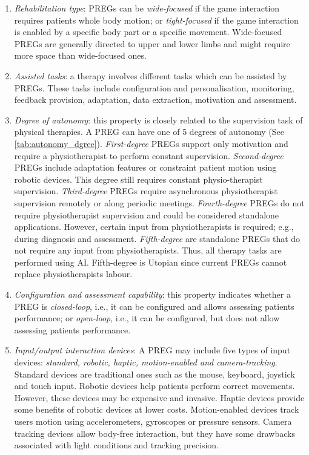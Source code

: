 \begin{enumerate}
    \item \emph{Rehabilitation type}: \acp{PREG} can be \textit{wide-focused} if the game interaction requires patients whole body motion; or \textit{tight-focused} if the game interaction is enabled by a specific body part or a specific movement. Wide-focused \acp{PREG} are generally directed to upper and lower limbs and might require more space than wide-focused ones.
    
    \item \emph{Assisted tasks}: a therapy involves different tasks which can be assisted by \acp{PREG}. These tasks include configuration and personalisation, monitoring, feedback provision, adaptation, data extraction, motivation and assessment.
    
    \item \emph{Degree of autonomy}: this property is closely related to the supervision task of physical therapies. A \ac{PREG} can have one of 5 degrees of autonomy (See \autoref{tab:autonomy_dgree}). \textit{First-degree} \acp{PREG} support only motivation and require a physiotherapist to perform constant supervision. \textit{Second-degree} \acp{PREG} include adaptation features or constraint patient motion using robotic devices. This degree still requires constant physio-therapist supervision. \textit{Third-degree} \acp{PREG} require asynchronous physiotherapist supervision remotely or along periodic meetings. \textit{Fourth-degree} \acp{PREG} do not require physiotherapist supervision and could be considered standalone applications. However, certain input from physiotherapists is required; e.g., during diagnosis and assessment. \textit{Fifth-degree} are standalone \acp{PREG} that do not require any input from physiotherapists. Thus, all therapy tasks are performed using \ac{AI}. Fifth-degree is Utopian since current \acp{PREG} cannot replace physiotherapists labour.
    
    \item \emph{Configuration and assessment capability}: this property indicates whether a \ac{PREG} is \textit{closed-loop}, i.e., it can be configured and allows assessing patients performance; or \textit{open-loop}, i.e., it can be configured, but does not allow assessing patients performance.
    
    \item \emph{Input/output interaction devices}: A \ac{PREG} may include five types of input devices: \textit{standard, robotic, haptic, motion-enabled and camera-tracking}. Standard devices are traditional ones such as the mouse, keyboard, joystick and touch input. Robotic devices help patients perform correct movements. However, these devices may be expensive and invasive. Haptic devices provide some benefits of robotic devices at lower costs. Motion-enabled devices track users motion using accelerometers, gyroscopes or pressure sensors. Camera tracking devices allow body-free interaction, but they have some drawbacks associated with light conditions and tracking precision.
    

\end{enumerate}
